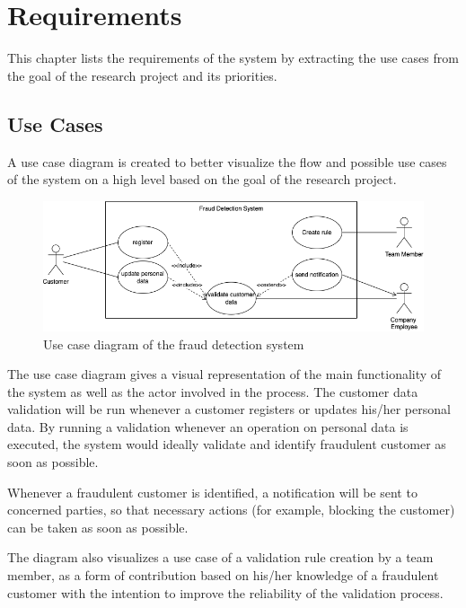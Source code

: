 \section{Requirements}

  This chapter lists the requirements of the system by extracting the use cases from the goal of the research project and its priorities. 

  \subsection{Use Cases}
    \label{use_cases}

    A use case diagram is created to better visualize the flow and possible use cases of the system on a high level based on the goal of the research project.

    \begin{figure}[!ht]
     \includegraphics[width=\textwidth]{diagrams/use-case-diagram.png}
     \caption{Use case diagram of the fraud detection system}
     \label{fig:use_cases}
    \end{figure}

    The use case diagram gives a visual representation of the main functionality of the system as well as the actor involved in the process. The customer data validation will be run whenever a customer registers or updates his/her personal data. By running a validation whenever an operation on personal data is executed, the system would ideally validate and identify fraudulent customer as soon as possible. 
    
    Whenever a fraudulent customer is identified, a notification will be sent to concerned parties, so that necessary actions (for example, blocking the customer) can be taken as soon as possible. 

    The diagram also visualizes a use case of a validation rule creation by a team member, as a form of contribution based on his/her knowledge of a fraudulent customer with the intention to improve the reliability of the validation process.
    
